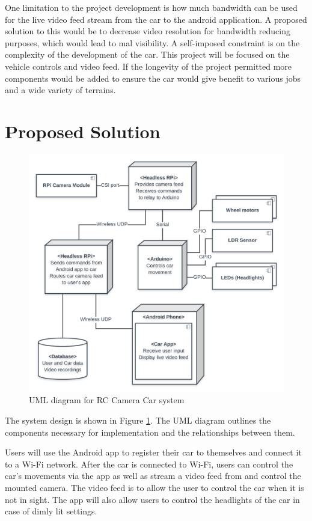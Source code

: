 \documentclass[letterpaper,12pt]{report}
\begin{document}
	One limitation to the project development is how much bandwidth can be used
	for the live video feed stream from the car to the android application. A
	proposed solution to this would be to decrease video resolution for
	bandwidth reducing purposes, which would lead to mal visibility. A
	self-imposed constraint is on the complexity of the development of the car.
	This project will be focused on the vehicle controls and video feed. If the
	longevity of the project permitted more components would be added to ensure
	the car would give benefit to various jobs and a wide variety of terrains.

	\section*{Proposed Solution}
	\markright{}

	\begin{figure}[H]
    	\centering
		\includegraphics[width=\linewidth]{Proposal_UML_Diagram.png}
    	\caption{UML diagram for RC Camera Car system}
    	\label{fig:uml}
	\end{figure}

	The system design is shown in Figure \ref{fig:uml}. The UML diagram outlines
	the components necessary for implementation and the relationships between
	them. 

	Users will use the Android app to register their car to themselves and
	connect it to a Wi-Fi network. After the car is connected to Wi-Fi, users
	can control the car’s movements via the app as well as stream a video feed
	from and control the mounted camera. The video feed is to allow the user to
	control the car when it is not in sight. The app will also allow users to
	control the headlights of the car in case of dimly lit settings.
\end{document}
